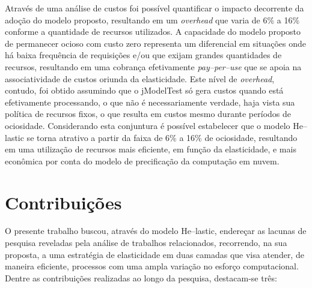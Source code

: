 \documentclass[english,brazilian]{UNISINOSmonografia} %
\begin{document}
Através de uma análise de custos foi possível quantificar o impacto decorrente da adoção do modelo proposto, resultando em um \textit{overhead} que varia de 6\% a 16\% conforme a quantidade de recursos utilizados.
A capacidade do modelo proposto de permanecer ocioso com custo zero representa um diferencial em situações onde há baixa frequência de requisições e/ou que exijam grandes quantidades de recursos, resultando em uma cobrança efetivamente \textit{pay--per--use} que se apoia na associatividade de custos oriunda da elasticidade.
Este nível de \textit{overhead}, contudo, foi obtido assumindo que o jModelTest só gera custos quando está efetivamente processando, o que não é necessariamente verdade, haja vista sua política de recursos fixos, o que resulta em custos mesmo durante períodos de ociosidade.
Considerando esta conjuntura é possível estabelecer que o modelo \textsf{He}--lastic se torna atrativo a partir da faixa de 6\% a 16\% de ociosidade, resultando em uma utilização de recursos mais eficiente, em função da elasticidade, e mais econômica por conta do modelo de precificação da computação em nuvem.



\section{Contribuições}


O presente trabalho buscou, através do modelo \textsf{He}--lastic, endereçar as lacunas de pesquisa reveladas pela análise de trabalhos relacionados, recorrendo, na sua proposta, a uma estratégia de elasticidade em duas camadas que visa atender, de maneira eficiente, processos com uma ampla variação no esforço computacional.
Dentre as contribuições realizadas ao longo da pesquisa, destacam-se três:
\end{document}
